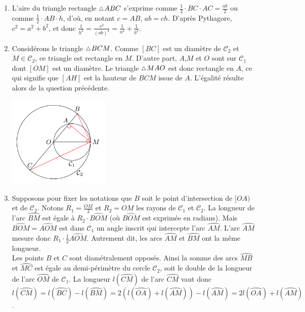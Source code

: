 \documentclass[a4paper,12pt,reqno]{amsart}
\begin{document}
\begin{solution}
  \begin{enumerate}
    \item L'aire du triangle rectangle $\tri ABC$ s'exprime comme $\frac{1}{2} \cdot BC \cdot AC = \frac{ab}{2}$ ou comme $\frac{1}{2} \cdot AB \cdot h$, d'où, en notant $c=AB$, $ab=ch$. D'après Pythagore, $c^2=a^2+b^2$, et donc $ \frac{1}{h^2}= \frac{c^2}{(ab)^2} =\frac{1}{a^2}+\frac{1}{b^2}$.
    \item Considérons le triangle $\tri BCM$. Comme $[BC]$ est un diamètre de $\mathcal{C}_2$ et $M \in \mathcal{C}_2$, ce triangle est rectangle en $M$. D'autre part, $A$,$M$ et $O$ sont sur $\mathcal{C}_1$ dont $[OM]$ est un diamètre. Le triangle $\tri MAO$ est donc rectangle en $A$, ce qui signifie que $[AH]$ est la hauteur de $BCM$ issue de $A$. L'égalité résulte alors de la question précédente.
    \begin{center}
      \includegraphics[width=4.9cm]{M67_2018-19_DS2_img_triangle_rectangle_cercles}
    \end{center}
    \item Supposons pour fixer les notations que $B$ soit le point d'intersection de $[OA)$ et de $\mathcal{C}_2$. Notons $R_1=\frac{OM}{2}$ et $R_2=OM$ les rayons de $\mathcal{C}_1$ et $\mathcal{C}_2$. La longueur de l'arc $\wideparen{BM}$ est égale à $R_2 \cdot \widehat{BOM}$ (où $\widehat{BOM}$ est exprimée en radians). Mais $\widehat{BOM}=\widehat{AOM}$ est dans $\mathcal{C}_1$ un angle inscrit qui intercepte l'arc $\wideparen{AM}$. L'arc $\wideparen{AM}$ mesure donc $R_1 \cdot \frac{1}{2}\widehat{AOM}$. Autrement dit, les arcs $\wideparen{AM}$ et $\wideparen{BM}$ ont la même longueur.\\
    Les points $B$ et $C$ sont diamétralement opposés. Ainsi la somme des arcs $\wideparen{MB}$ et $\wideparen{MC}$ est égale au demi-périmètre du cercle $\mathcal{C}_2$, soit le double de la longueur de l'arc $\wideparen{OM}$ de $\mathcal{C}_1$. La longueur $l(\wideparen{CM})$ de l'arc $\wideparen{CM}$ vaut donc $l(\wideparen{CM})=l(\wideparen{BC})-l(\wideparen{BM})=2(l(\wideparen{OA})+l(\wideparen{AM}))-l(\wideparen{AM})=2l(\wideparen{OA})+l(\wideparen{AM})$.
  \end{enumerate}
\end{solution}
\end{document}
